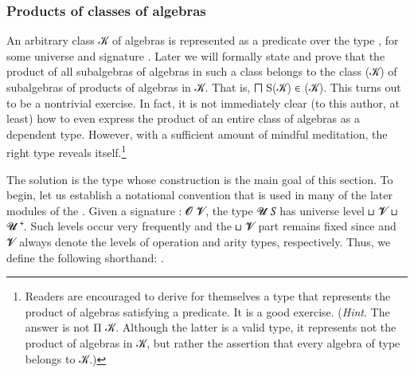 \subsubsection{Products of classes of algebras}\label{products-of-classes-of-algebras}

An arbitrary class \ab 𝒦 of algebras is represented as a predicate over the type \AgdaSpace{}\AgdaSpace{}, for some universe  and signature .
Later we will formally state and prove that the product of all subalgebras of algebras in such a class belongs to the class (\ab 𝒦) of subalgebras of products of algebras in \ab 𝒦. That is, \af ⨅ \af S(\ab 𝒦) \af ∈ (\ab 𝒦). This turns out to be a nontrivial exercise. In fact, it is not immediately clear (to this author, at least) how to even express the product of an entire class of algebras as a dependent type. However, with a sufficient amount of mindful meditation, the right type reveals itself.\footnote{%
Readers are encouraged to derive for themselves a type that represents the product of algebras satisfying a predicate. It is a good exercise. (\textit{Hint}. The answer is not \ad Π \ab 𝒦. Although the latter is a valid type, it represents not the product of algebras in \ab 𝒦, but rather the assertion that every algebra of type \AgdaSpace{}\AgdaSpace{} belongs to \ab 𝒦.)}

The solution is the  type whose construction is the main goal of this section. To begin, let us establish a notational convention that is used in many of the later modules of the \ualib. Given a signature  \as :  \ab  𝓞 \ab 𝓥, the type  \ab 𝓤 \ab 𝑆 has universe level  \ap ⊔ \ab 𝓥 \ap ⊔ \ab 𝓤 \af ⁺. Such levels occur very frequently and the  \ap ⊔ \ab 𝓥 part remains fixed since  and \ab 𝓥 always denote the levels of operation and arity types, respectively. Thus, we define the following shorthand: \AgdaSpace{}%
\AgdaSpace{}%
\AgdaSymbol{:=}\AgdaSpace{}%
\AgdaSpace{}%
\AgdaSpace{}%
\AgdaSpace{}%
\AgdaSpace{}%
\AgdaSpace{}%
.

